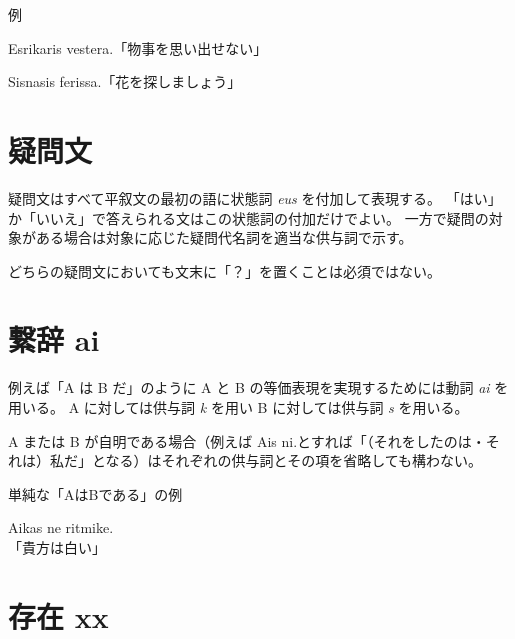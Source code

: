 \begin{itembox}[l]{例}
    \begin{pindent}
        \noindent
        Esrikaris vestera.「物事を思い出せない」

        \noindent
        Sisnasis ferissa.「花を探しましょう」
    \end{pindent}
\end{itembox}

\section{疑問文}

疑問文はすべて平叙文の最初の語に状態詞 \emph{eus} を付加して表現する。
「はい」か「いいえ」で答えられる文はこの状態詞の付加だけでよい。
一方で疑問の対象がある場合は対象に応じた疑問代名詞を適当な供与詞で示す。

どちらの疑問文においても文末に「？」を置くことは必須ではない。

\section{繋辞 ai}

例えば「A は B だ」のように A と B の等価表現を実現するためには動詞 \emph{ai} を用いる。
A に対しては供与詞 \emph{k} を用い B に対しては供与詞 \emph{s} を用いる。

A または B が自明である場合（例えば Ais ni.とすれば「（それをしたのは・それは）私だ」となる）はそれぞれの供与詞とその項を省略しても構わない。

\begin{itembox}[l]{単純な「AはBである」の例}
    \begin{pindent}
        \noindent
        Aikas ne ritmike. \\
        「貴方は白い」
    \end{pindent}
\end{itembox}

\section{存在 xx}

